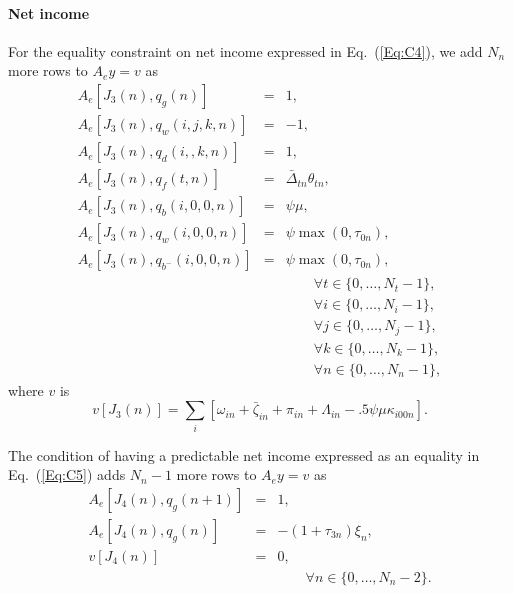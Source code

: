 \documentclass{article}[fleqn,12pt]
\begin{document}
\paragraph*{Net income}
For the equality constraint on net income expressed in Eq.~(\ref{Eq:C4}),
we add $N_n$ more rows to $A_ey = v$ as
\begin{eqnarray}
	A_e[J_3(n), q_g(n)] &=& 1, \nonumber \\
	A_e[J_3(n), q_w(i, j ,k, n)] &=& -1,\nonumber \\
	A_e[J_3(n), q_d(i, ,k, n)] &=& 1, \nonumber \\
	A_e[J_3(n), q_f(t, n)] &=& \bar\Delta_{t n}\theta_{t n}, \nonumber \\
	A_e[J_3(n), q_b(i, 0, 0, n)] &=& \psi\mu, \nonumber \\
	A_e[J_3(n), q_w(i, 0, 0, n)] &=& \psi\max(0, \tau_{0n}), \nonumber \\
	A_e[J_3(n), q_{b^-}(i, 0, 0, n)] &=& \psi\max(0, \tau_{0n}), \nonumber \\
	&&\qquad\forall t \in \{0,\ldots, N_t-1\},\nonumber\\
	&&\qquad\forall i \in \{0,\ldots, N_i-1\},\nonumber\\
	&&\qquad\forall j \in \{0,\ldots, N_j-1\},\nonumber\\
	&&\qquad\forall k \in \{0,\ldots, N_k-1\},\nonumber\\
	&&\qquad\forall n \in \{0,\ldots, N_n-1\}, \nonumber
\end{eqnarray}
where $v$ is
\begin{equation}
	v[J_3(n)] = \sum_i [\omega_{in} + \bar\zeta_{in} + \pi_{in}
	+ \Lambda_{in} - .5\psi\mu\kappa_{i00n}].
\end{equation}

The condition of having a predictable net income expressed as an
equality in Eq.~(\ref{Eq:C5}) adds $N_n-1$ more rows to $A_ey = v$ as
\begin{eqnarray}
	A_e[J_4(n), q_g(n+1)] &=& 1, \nonumber \\
	A_e[J_4(n), q_g(n)] &=& -(1 + \tau_{3n})\xi_n, \nonumber \\
	v[J_4(n)] &=& 0, \\
	&&\qquad\forall n \in \{0,\ldots, N_n-2\}. \nonumber
\end{eqnarray}
\end{document}
